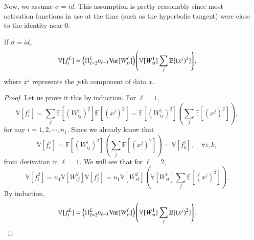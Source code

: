 Now, we assume $\sigma  = id$. This assumption is pretty reasonably since most activation functions in use at the time (such as the hyperbolic tangent) were close to the identity near $0$. 

\begin{lemma}\label{th:idnormal}
If $\sigma  = id$, 
 \begin{equation}\label{key}
	\mathbb V [f^{L}_i] =  \left(\Pi_{\ell=2}^{L} n_{\ell-1} {\rm Var} [W^\ell_{st}] \right) \left(\mathbb{V}[W^1_{st}]\sum_{j}\mathbb{E}[( x^j)^2] \right),
	\end{equation}
where $x^j$ represents the $j$-th component of data $x$.
\end{lemma}
\begin{proof}
Let us prove it this by induction. For $\ell=1$,
\begin{equation}\label{key}
\mathbb{V}[f^{1}_i] = \sum_{j}\mathbb{E}[(W^1_{ij})^2]\mathbb{E}[( x^j)^2] = {\mathbb{E}[(W^1_{ij})^2]  \left(\sum_{j}\mathbb{E}[( x^j)^2] \right)},
\end{equation}
for any $i = 1,2,\cdots, n_1$. Since we already know that
	\begin{equation}\label{key}
	\mathbb{V}[f^1_i ] = {\mathbb{E}[(W^1_{ij})^2]  \left(\sum_{j}\mathbb{E}[( x^j)^2] \right)} = \mathbb{V}[f^1_k], \quad \forall i,k,
	\end{equation}
	from derivation in $\ell=1$. We will see that for $\ell=2$,
	\begin{equation}\label{key}
	\mathbb{V}[f^2_i ] = n_1 \mathbb{V}[W^2_{ij}]  \mathbb{V}[ f^1_j] = n_1     \mathbb{V}[W^2_{st}] \left(\mathbb{V}[W^1_{st}]\sum_{j}\mathbb{E}[(x^j)^2] \right).
	\end{equation}
By induction, 
\begin{equation}\label{key}
	\mathbb V [f^{L}_i] =  \left(\Pi_{\ell=2}^{L} n_{\ell-1} {\rm Var} [W^\ell_{st}] \right) \left(\mathbb{V}[W^1_{st}]\sum_{j}\mathbb{E}[( x^j)^2] \right).
	\end{equation}
\end{proof}

